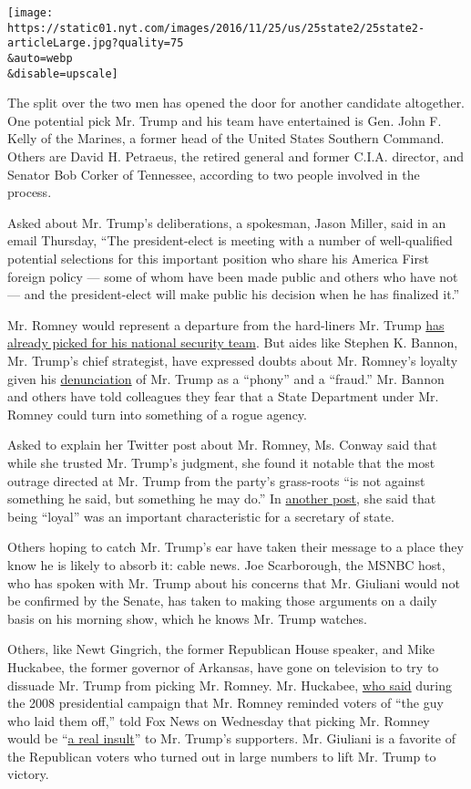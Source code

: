 \texttt{[image: https://static01.nyt.com/images/2016/11/25/us/25state2/25state2-articleLarge.jpg?quality=75\\\&auto=webp\\\&disable=upscale]}

The split over the two men has opened the door for another candidate
altogether. One potential pick Mr. Trump and his team have entertained
is Gen. John F. Kelly of the Marines, a former head of the United States
Southern Command. Others are David H. Petraeus, the retired general and
former C.I.A. director, and Senator Bob Corker of Tennessee, according
to two people involved in the process.

Asked about Mr. Trump's deliberations, a spokesman, Jason Miller, said
in an email Thursday, ``The president-elect is meeting with a number of
well-qualified potential selections for this important position who
share his America First foreign policy --- some of whom have been made
public and others who have not --- and the president-elect will make
public his decision when he has finalized it.''

Mr. Romney would represent a departure from the hard-liners Mr. Trump
\href{http://www.nytimes.com/2016/11/19/us/politics/donald-trump-administration.html}{has
already picked for his national security team}. But aides like Stephen
K. Bannon, Mr. Trump's chief strategist, have expressed doubts about Mr.
Romney's loyalty given his
\href{http://www.nytimes.com/2016/03/04/us/politics/mitt-romney-speech.html}{denunciation}
of Mr. Trump as a ``phony'' and a ``fraud.'' Mr. Bannon and others have
told colleagues they fear that a State Department under Mr. Romney could
turn into something of a rogue agency.

Asked to explain her Twitter post about Mr. Romney, Ms. Conway said that
while she trusted Mr. Trump's judgment, she found it notable that the
most outrage directed at Mr. Trump from the party's grass-roots ``is not
against something he said, but something he may do.'' In
\href{https://twitter.com/KellyannePolls/status/801796408521138176}{another
post}, she said that being ``loyal'' was an important characteristic for
a secretary of state.

Others hoping to catch Mr. Trump's ear have taken their message to a
place they know he is likely to absorb it: cable news. Joe Scarborough,
the MSNBC host, who has spoken with Mr. Trump about his concerns that
Mr. Giuliani would not be confirmed by the Senate, has taken to making
those arguments on a daily basis on his morning show, which he knows Mr.
Trump watches.

Others, like Newt Gingrich, the former Republican House speaker, and
Mike Huckabee, the former governor of Arkansas, have gone on television
to try to dissuade Mr. Trump from picking Mr. Romney. Mr. Huckabee,
\href{http://latimesblogs.latimes.com/showtracker/2008/01/excerpts-from-p.html}{who
said} during the 2008 presidential campaign that Mr. Romney reminded
voters of ``the guy who laid them off,'' told Fox News on Wednesday that
picking Mr. Romney would be
``\href{http://insider.foxnews.com/2016/11/23/huckabee-choosing-romney-secy-state-would-be-real-insult-trump-voters}{a
real insult}'' to Mr. Trump's supporters. Mr. Giuliani is a favorite of
the Republican voters who turned out in large numbers to lift Mr. Trump
to victory.

